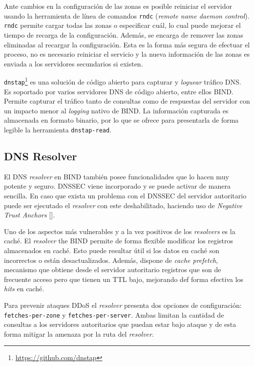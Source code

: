 Ante cambios en la configuración de las zonas es posible reiniciar el servidor usando la herramienta de línea de comandos \verb+rndc+ (\textit{remote name daemon control}). \verb+rndc+ permite cargar todas las zonas o especificar cuál, lo cual puede mejorar el tiempo de recarga de la configuración. Además, se encarga de remover las zonas eliminadas al recargar la configuración. Esta es la forma más segura de efectuar el proceso, no es necesario reiniciar el servicio y la nueva información de las zonas es enviada a los servidores secundarios si existen.

\verb+dnstap+\footnote{\url{https://github.com/dnstap}} es una solución de código abierto para capturar y \textit{loguear} tráfico DNS. Es soportado por varios servidores DNS de código abierto, entre ellos BIND. Permite capturar el tráfico tanto de consultas como de respuestas del servidor con un impacto menor al \textit{logging} nativo de BIND. La información capturada es almacenada en formato binario, por lo que se ofrece para presentarla de forma legible la herramienta \verb+dnstap-read+. 

\subsection{DNS Resolver}

El DNS \textit{resolver} en BIND también posee funcionalidades que lo hacen muy potente y seguro. DNSSEC viene incorporado y se puede activar de manera sencilla. En caso que exista un problema con el DNSSEC del servidor autoritario puede ser ejecutado el \textit{resolver} con este deshabilitado, haciendo uso de \textit{Negative Trust Anchors} [\cite{rfc_7646}].

Uno de los aspectos más vulnerables y a la vez positivos de los \textit{resolvers} es la caché. El \textit{resolver} the BIND permite de forma flexible modificar los registros almacenados en caché. Esto puede resultar útil si los datos en caché son incorrectos o están desactualizados. Además, dispone de \textit{cache prefetch}, mecanismo que obtiene desde el servidor autoritario registros que son de frecuente acceso pero que tienen un TTL bajo, mejorando def forma efectiva los \textit{hits} en caché.

Para prevenir ataques DDoS el \textit{resolver} presenta dos opciones de configuración: \verb+fetches-per-zone+ y \verb+fetches-per-server+. Ambas limitan la cantidad de consultas a los servidores autoritarios que puedan estar bajo ataque y de esta forma mitigar la amenaza por la ruta del \textit{resolver}.

